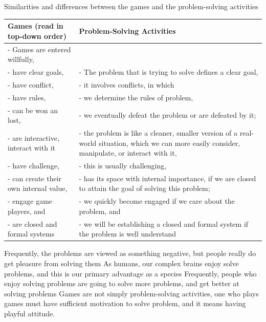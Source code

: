 \begin{quadro}[htb]
\caption{Similarities and differences between the games and the problem-solving activities}
\label{qua:game-and-problem-solving}
\centering
\small
\begin{tabular}{m{5.5cm}|m{9.5cm}}
\textbf{Games} (read in top-down order) & \textbf{Problem-Solving Activities} \\ \hline \hline
- Games are entered willfully, &  \\
- have clear goals,  & - The problem that is trying to solve defines a clear goal, \\
- have conflict, & - it involves conflicts, in which \\
- have rules, & - we determine the rules of problem, \\
- can be won an lost, & - we eventually defeat the problem or are defeated by it; \\
- are interactive, interact with it & - the problem is like a cleaner, smaller version of a real-world situation, which we can more easily consider, manipulate, or interact with it, \\
- have challenge, & - this is usually challenging, \\
- can create their own internal value, & - has its space with internal importance, if we are closed to attain the goal of solving this problem; \\
- engage game players, and & - we quickly become engaged if we care about the problem, and \\
- are closed and formal systems & - we will be establishing a closed and formal system if the problem is well understand \\
\end{tabular}
\end{quadro}

Frequently, the problems are viewed as something negative, but people really do get pleasure from solving them
As humans, our complex brains enjoy solve problems, and this is our primary advantage as a species
Frequently, people who enjoy solving problems are going to solve more problems, and get better at solving problems
Games are not simply problem-solving activities, one who plays games must have sufficient motivation to solve problem, and it means having playful attitude.

